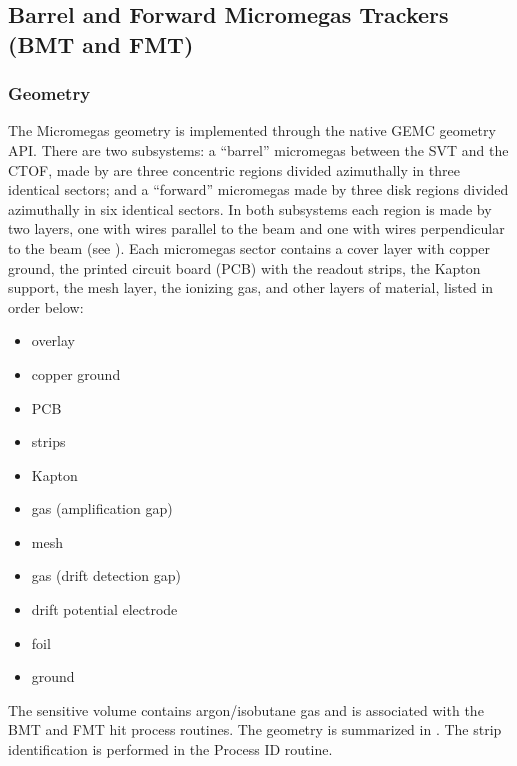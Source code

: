 \subsection{Barrel and Forward Micromegas Trackers (BMT and FMT)}

\subsubsection{Geometry}

The Micromegas geometry is implemented through the native GEMC geometry API. There are two subsystems: a ``barrel'' micromegas
between the SVT and the CTOF, made by are three concentric regions divided azimuthally in three identical sectors; and a ``forward'' micromegas
made by three disk regions divided azimuthally in six identical sectors. In both subsystems each region is made by two layers,
one with wires parallel to the beam and one with wires perpendicular to the beam (see ).
Each micromegas sector contains a cover layer with copper ground, the printed circuit board (PCB) with the readout strips,
the Kapton support, the mesh layer, the ionizing gas, and other layers of material, listed in order below:

\begin{itemize}
	\item overlay
	\item copper ground
	\item PCB
	\item strips
	\item Kapton
	\item gas (amplification gap)
	\item mesh
	\item gas (drift detection gap)
	\item drift potential electrode
	\item foil
	\item ground
\end{itemize}

The sensitive volume contains argon/isobutane gas and is associated with the BMT and FMT hit process routines.
The geometry is summarized in . The strip identification is performed in the Process ID routine.

